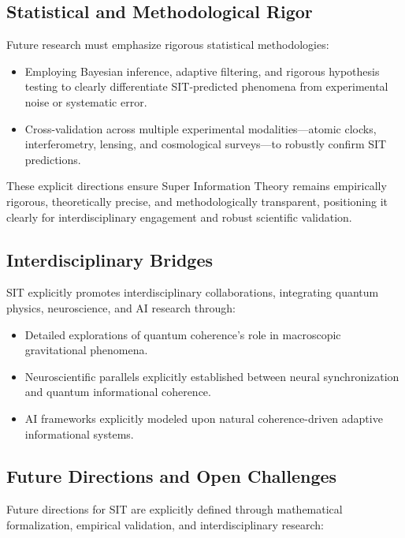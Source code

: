 \documentclass[american,11pt,letterpaper]{article}
\begin{document}
\subsection{Statistical and Methodological Rigor}

Future research must emphasize rigorous statistical methodologies:
\begin{itemize}
    \item Employing Bayesian inference, adaptive filtering, and rigorous hypothesis testing to clearly differentiate SIT-predicted phenomena from experimental noise or systematic error.
    \item Cross-validation across multiple experimental modalities---atomic clocks, interferometry, lensing, and cosmological surveys---to robustly confirm SIT predictions.
\end{itemize}

These explicit directions ensure Super Information Theory remains empirically rigorous, theoretically precise, and methodologically transparent, positioning it clearly for interdisciplinary engagement and robust scientific validation.

\subsection{Interdisciplinary Bridges}

SIT explicitly promotes interdisciplinary collaborations, integrating quantum physics, neuroscience, and AI research through:

\begin{itemize}
\item Detailed explorations of quantum coherence's role in macroscopic gravitational phenomena.
\item Neuroscientific parallels explicitly established between neural synchronization and quantum informational coherence.
\item AI frameworks explicitly modeled upon natural coherence-driven adaptive informational systems.
\end{itemize}

\subsection{Future Directions and Open Challenges}

Future directions for SIT are explicitly defined through mathematical formalization, empirical validation, and interdisciplinary research:
\end{document}
